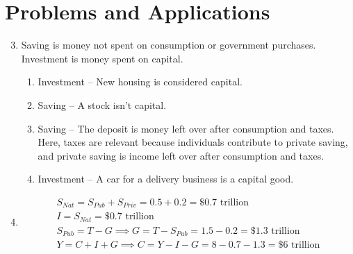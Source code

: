 \documentclass{article}
\begin{document}
\section*{Problems and Applications}

\begin{enumerate}

\setcounter{enumi}{2}

\item Saving is money not spent on consumption or government purchases. Investment is money spent on capital.

	\begin{enumerate}
	
	\item Investment -- New housing is considered capital.
	
	\item Saving -- A stock isn't capital.
	
	\item Saving -- The deposit is money left over after consumption and taxes. Here, taxes are relevant because individuals contribute to private saving, and private saving is income left over after consumption and taxes.
	
	\item Investment -- A car for a delivery business is a capital good.
	
	\end{enumerate}
	
\item \begin{gather*}
	S_{Nat} = S_{Pub} + S_{Priv} = 0.5 + 0.2 = \$0.7 \text{ trillion} \\
	I = S_{Nat} = \$0.7 \text{ trillion} \\
	S_{Pub} = T - G \implies G = T - S_{Pub} = 1.5 - 0.2 = \$1.3 \text{ trillion} \\
	Y = C + I + G \implies C = Y - I - G = 8 - 0.7 - 1.3 = \$ 6 \text{ trillion}
	\end{gather*}

\end{enumerate}
\end{document}
